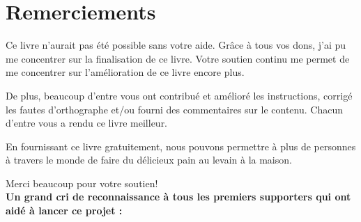 \chapter{Remerciements}%
\label{ch:Remerciements}
Ce livre n'aurait pas été possible sans votre aide.
Grâce à tous vos dons, j'ai pu me concentrer sur la finalisation
de ce livre. Votre soutien continu me permet de me concentrer
sur l'amélioration de ce livre encore plus.

De plus, beaucoup d'entre vous ont contribué et amélioré les
instructions, corrigé les fautes d'orthographe et/ou fourni
des commentaires sur le contenu. Chacun d'entre vous a rendu ce livre
meilleur.

En fournissant ce livre gratuitement,
nous pouvons permettre à plus de personnes à travers le monde de faire du délicieux pain au levain
à la maison.

Merci beaucoup pour votre soutien!\\

\textbf{Un grand cri de reconnaissance à tous les premiers supporters qui ont aidé à lancer ce
projet :\\}

